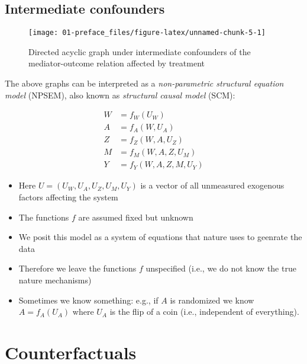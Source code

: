 \documentclass[
  12pt,
]{book}
\providecommand{\tightlist}{%
  \setlength{\itemsep}{0pt}\setlength{\parskip}{0pt}}
\theoremstyle{definition}
\theoremstyle{definition}
\theoremstyle{definition}
\newcommand{\1}{\mathbbm{1}}
\begin{document}
\hypertarget{intermediate-confounders}{%
\subsection{Intermediate confounders}\label{intermediate-confounders}}

\begin{figure}

{\centering \texttt{[image: 01-preface\_files/figure-latex/unnamed-chunk-5-1]} 

}

\caption{Directed acyclic graph under intermediate confounders of the mediator-outcome relation affected by treatment}\label{fig:unnamed-chunk-5}
\end{figure}

The above graphs can be interpreted as a \emph{non-parametric structural equation model}
(NPSEM), also known as \emph{structural causal model} (SCM):

\begin{align}
  W & = f_W(U_W)\\
  A & = f_A(W, U_A)\\
  Z & = f_Z(W, A, U_Z)\\
  M & = f_M(W, A, Z, U_M)\\
  Y & = f_Y(W, A, Z, M, U_Y)
\end{align}

\begin{itemize}
\tightlist
\item
  Here \(U=(U_W, U_A, U_Z, U_M, U_Y)\) is a vector of all unmeasured exogenous
  factors affecting the system
\item
  The functions \(f\) are assumed fixed but unknown
\item
  We posit this model as a system of equations that nature uses to geenrate the
  data
\item
  Therefore we leave the functions \(f\) unspecified (i.e., we do not know the
  true nature mechanisms)
\item
  Sometimes we know something: e.g., if \(A\) is randomized we know \(A=f_A(U_A)\)
  where \(U_A\) is the flip of a coin (i.e., independent of everything).
\end{itemize}

\hypertarget{counterfactuals}{%
\section{Counterfactuals}\label{counterfactuals}}
\end{document}
